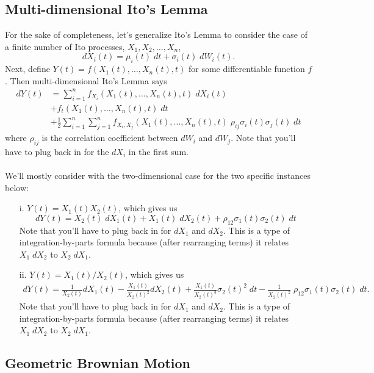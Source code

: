 \documentclass[12pt]{article}
\theoremstyle{plain}
\theoremstyle{definition}
\theoremstyle{remark}
\begin{document}
\subsection{Multi-dimensional Ito's Lemma}

For the sake of completeness, let's generalize Ito's Lemma to consider
the case of a finite number of Ito processes, $X_1, X_2, \ldots, X_n$,
   \[ dX_i(t) = \mu_i(t)\; dt + \sigma_i(t) \; dW_i(t).\]
Next, define $Y(t) = f(X_1(t), \ldots, X_n(t), t)$ for some
differentiable function $f$.  Then multi-dimensional Ito's Lemma says
\begin{align*}
    dY(t) &= \sum^n_{i=1} f_{X_i}(X_1(t), \ldots, X_n(t), t) \;
      dX_i(t) \\
    &+ f_{t}(X_1(t), \ldots, X_n(t), t) \; dt \\
    &+ \frac{1}{2} \sum^n_{i=1}\sum^n_{j=1}
      f_{X_i,X_j}(X_1(t), \ldots, X_n(t), t) \; \rho_{ij}\sigma_i(t)
      \sigma_j(t) \; dt
\end{align*}
where $\rho_{ij}$ is the correlation coefficient between $dW_i$ and
$dW_j$. Note that you'll have to plug back in for the $dX_i$ in the
first sum.
\\
\\
We'll mostly consider with the two-dimensional case for the
two specific instances below:
\begin{itemize}
   \item[i.]{$Y(t) = X_1(t)X_2(t)$, which gives us
      \[ dY(t) = X_2(t) \; dX_1(t) + X_1(t) \; dX_2(t) +
	 \rho_{12}\sigma_1(t)\sigma_2(t) \; dt \]
      Note that you'll have to plug back in for $dX_1$ and $dX_2$.
      This is a type of integration-by-parts formula because (after
      rearranging terms) it relates $X_1\; dX_2$ to $X_2\; dX_1$.
   }

   \item[ii.]{$Y(t) = X_1(t)/X_2(t)$, which gives us
      \begin{align*}
	 dY(t) = \frac{1}{X_2(t)} dX_1(t) - \frac{X_1(t)}{X_2(t)^2}
	 dX_2(t) +  \frac{X_1(t)}{X_2(t)^3} \sigma_2(t)^2 \;dt -
	 \frac{1}{X_2(t)^2} \; \rho_{12}\sigma_1(t)\sigma_2(t) \; dt.
      \end{align*}
      Note that you'll have to plug back in for $dX_1$ and $dX_2$.
      This is a type of integration-by-parts formula because (after
      rearranging terms) it relates $X_1\; dX_2$ to $X_2\; dX_1$.
      }
\end{itemize}


\subsection{Geometric Brownian Motion}
\end{document}
